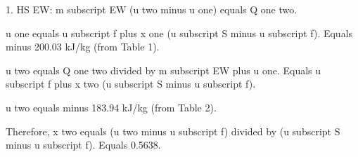 1. HS EW:  
m subscript EW (u two minus u one) equals Q one two.  

u one equals u subscript f plus x one (u subscript S minus u subscript f).  
Equals minus 200.03 kJ/kg (from Table 1).  

u two equals Q one two divided by m subscript EW plus u one.  
Equals u subscript f plus x two (u subscript S minus u subscript f).  

u two equals minus 183.94 kJ/kg (from Table 2).  

Therefore, x two equals (u two minus u subscript f) divided by (u subscript S minus u subscript f).  
Equals 0.5638.